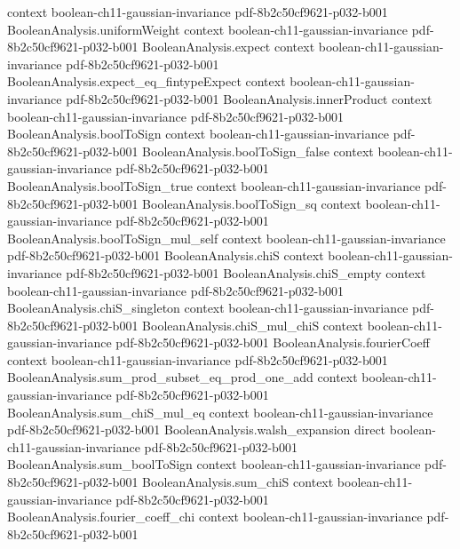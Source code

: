 \begin{theorem}
  {context}
  {boolean-ch11-gaussian-invariance}
  {pdf-8b2c50cf9621-p032-b001}
\proofstep
  {BooleanAnalysis.uniformWeight}
  {context}
  {boolean-ch11-gaussian-invariance}
  {pdf-8b2c50cf9621-p032-b001}
\proofstep
  {BooleanAnalysis.expect}
  {context}
  {boolean-ch11-gaussian-invariance}
  {pdf-8b2c50cf9621-p032-b001}
\proofstep
  {BooleanAnalysis.expect_eq_fintypeExpect}
  {context}
  {boolean-ch11-gaussian-invariance}
  {pdf-8b2c50cf9621-p032-b001}
\proofstep
  {BooleanAnalysis.innerProduct}
  {context}
  {boolean-ch11-gaussian-invariance}
  {pdf-8b2c50cf9621-p032-b001}
\proofstep
  {BooleanAnalysis.boolToSign}
  {context}
  {boolean-ch11-gaussian-invariance}
  {pdf-8b2c50cf9621-p032-b001}
\proofstep
  {BooleanAnalysis.boolToSign_false}
  {context}
  {boolean-ch11-gaussian-invariance}
  {pdf-8b2c50cf9621-p032-b001}
\proofstep
  {BooleanAnalysis.boolToSign_true}
  {context}
  {boolean-ch11-gaussian-invariance}
  {pdf-8b2c50cf9621-p032-b001}
\proofstep
  {BooleanAnalysis.boolToSign_sq}
  {context}
  {boolean-ch11-gaussian-invariance}
  {pdf-8b2c50cf9621-p032-b001}
\proofstep
  {BooleanAnalysis.boolToSign_mul_self}
  {context}
  {boolean-ch11-gaussian-invariance}
  {pdf-8b2c50cf9621-p032-b001}
\proofstep
  {BooleanAnalysis.chiS}
  {context}
  {boolean-ch11-gaussian-invariance}
  {pdf-8b2c50cf9621-p032-b001}
\proofstep
  {BooleanAnalysis.chiS_empty}
  {context}
  {boolean-ch11-gaussian-invariance}
  {pdf-8b2c50cf9621-p032-b001}
\proofstep
  {BooleanAnalysis.chiS_singleton}
  {context}
  {boolean-ch11-gaussian-invariance}
  {pdf-8b2c50cf9621-p032-b001}
\proofstep
  {BooleanAnalysis.chiS_mul_chiS}
  {context}
  {boolean-ch11-gaussian-invariance}
  {pdf-8b2c50cf9621-p032-b001}
\proofstep
  {BooleanAnalysis.fourierCoeff}
  {context}
  {boolean-ch11-gaussian-invariance}
  {pdf-8b2c50cf9621-p032-b001}
\proofstep
  {BooleanAnalysis.sum_prod_subset_eq_prod_one_add}
  {context}
  {boolean-ch11-gaussian-invariance}
  {pdf-8b2c50cf9621-p032-b001}
\proofstep
  {BooleanAnalysis.sum_chiS_mul_eq}
  {context}
  {boolean-ch11-gaussian-invariance}
  {pdf-8b2c50cf9621-p032-b001}
\proofstep
  {BooleanAnalysis.walsh_expansion}
  {direct}
  {boolean-ch11-gaussian-invariance}
  {pdf-8b2c50cf9621-p032-b001}
\proofstep
  {BooleanAnalysis.sum_boolToSign}
  {context}
  {boolean-ch11-gaussian-invariance}
  {pdf-8b2c50cf9621-p032-b001}
\proofstep
  {BooleanAnalysis.sum_chiS}
  {context}
  {boolean-ch11-gaussian-invariance}
  {pdf-8b2c50cf9621-p032-b001}
\proofstep
  {BooleanAnalysis.fourier_coeff_chi}
  {context}
  {boolean-ch11-gaussian-invariance}
  {pdf-8b2c50cf9621-p032-b001}
\proofstep

\end{theorem}
